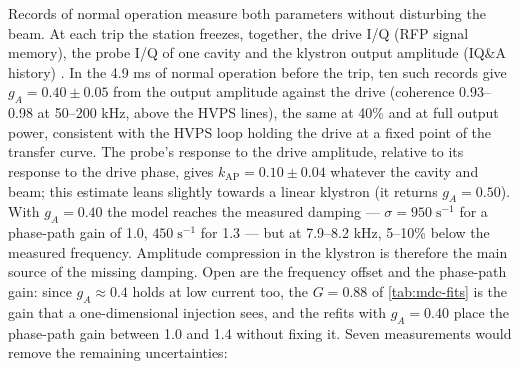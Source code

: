 Records of normal operation measure both parameters without disturbing the beam. At each trip the station freezes, together, the drive I/Q (RFP signal memory), the probe I/Q of one cavity and the klystron output amplitude (IQ\&A history) . In the 4.9 ms of normal operation before the trip, ten such records give \(g_A = 0.40 \pm 0.05\) from the output amplitude against the drive (coherence 0.93--0.98 at 50--200 kHz, above the HVPS lines), the same at 40\% and at full output power, consistent with the HVPS loop holding the drive at a fixed point of the transfer curve. The probe's response to the drive amplitude, relative to its response to the drive phase, gives \(k_\text{AP} = 0.10 \pm 0.04\) whatever the cavity and beam; this estimate leans slightly towards a linear klystron (it returns \(g_A = 0.50\)). With \(g_A = 0.40\) the model reaches the measured damping --- \(\sigma = 950\;\text{s}^{-1}\) for a phase-path gain of 1.0, \(450\;\text{s}^{-1}\) for 1.3 --- but at 7.9--8.2 kHz, 5--10\% below the measured frequency. Amplitude compression in the klystron is therefore the main source of the missing damping. Open are the frequency offset and the phase-path gain: since \(g_A \approx 0.4\) holds at low current too, the \(G = 0.88\) of \cref{tab:mdc-fits} is the gain that a one-dimensional injection sees, and the refits with \(g_A = 0.40\) place the phase-path gain between 1.0 and 1.4 without fixing it. Seven measurements would remove the remaining uncertainties:

